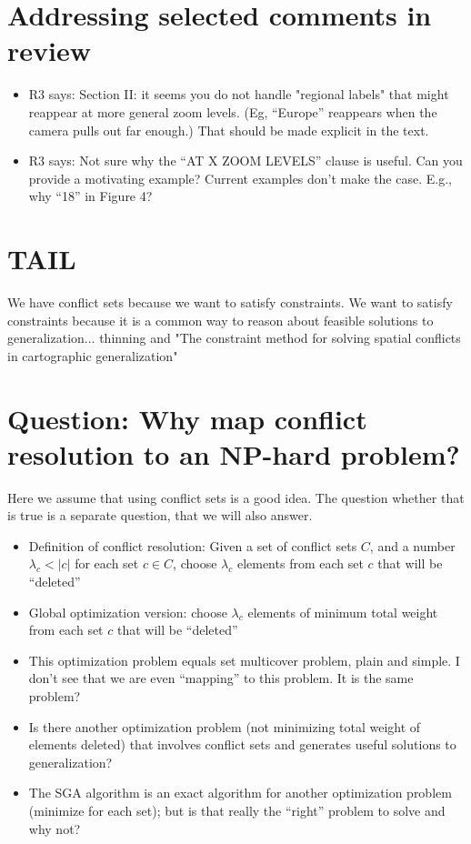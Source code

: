 \documentclass[11pt, oneside]{article}   	%
\begin{document}
\section{Addressing selected comments in review}

\begin{itemize}
\item R3 says:  Section II: it seems you do not handle "regional labels" that might reappear at more general zoom levels. (Eg, ``Europe'' reappears when the camera pulls out far enough.) That should be made explicit in the text.
\item R3 says: Not sure why the ``AT X ZOOM LEVELS'' clause is useful. Can you provide a motivating example? Current examples don't make the case. E.g., why ``18'' in Figure 4?
\end{itemize}


\section{TAIL}

We have conflict sets because we want to satisfy constraints. We want to satisfy constraints because it is a common way to reason about feasible solutions to generalization... thinning and "The constraint method for solving spatial conflicts in cartographic generalization"


\section{Question: Why map conflict resolution to an NP-hard problem?}
Here we assume that using conflict sets is a good idea. The question whether that is true is a separate question, that we will also answer.
\begin{itemize}
\item Definition of conflict resolution: Given a set of conflict sets $C$, and a number $\lambda_c < \left\vert c \right\vert$ for each set $c \in C$, choose $\lambda_c$ elements from each set $c$ that will be ``deleted'' 
\item Global optimization version: choose $\lambda_c$ elements of minimum total weight from each set $c$ that will be ``deleted'' 
\item This optimization problem equals set multicover problem, plain and simple. I don't see that we are even ``mapping'' to this problem. It is the same problem?
\item Is there another optimization problem (not minimizing total weight of elements deleted) that involves conflict sets and generates useful solutions to generalization?
\item The SGA algorithm is an exact algorithm for another optimization problem (minimize for each set); but is that really the ``right'' problem to solve and why not?
\end{itemize}
\end{document}
